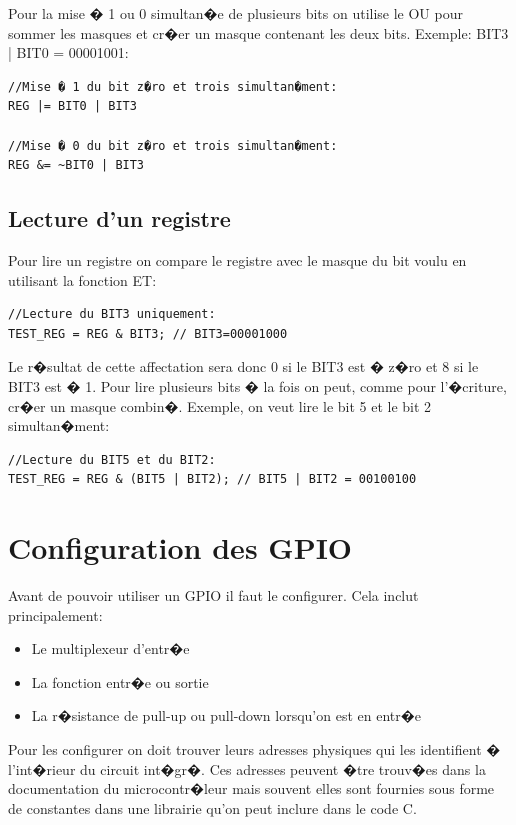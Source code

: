 Pour la mise � 1 ou 0 simultan�e de plusieurs bits on utilise le OU pour sommer les masques et cr�er un masque contenant les deux bits. Exemple: BIT3 | BIT0 = 00001001:

\lstset{style=customc}
\begin{lstlisting}
//Mise � 1 du bit z�ro et trois simultan�ment:
REG |= BIT0 | BIT3

//Mise � 0 du bit z�ro et trois simultan�ment:
REG &= ~BIT0 | BIT3
\end{lstlisting}

\subsection{Lecture d'un registre}

Pour lire un registre on compare le registre avec le masque du bit voulu en utilisant la fonction ET: 

\lstset{style=customc}
\begin{lstlisting}
//Lecture du BIT3 uniquement:
TEST_REG = REG & BIT3; // BIT3=00001000
\end{lstlisting}

Le r�sultat de cette affectation sera donc 0 si le BIT3 est � z�ro et 8 si le BIT3 est � 1. Pour lire plusieurs bits � la fois on peut, comme pour l'�criture, cr�er un masque combin�. Exemple, on veut lire le bit 5 et le bit 2 simultan�ment:

\lstset{style=customc}
\begin{lstlisting}
//Lecture du BIT5 et du BIT2:
TEST_REG = REG & (BIT5 | BIT2); // BIT5 | BIT2 = 00100100
\end{lstlisting}

\section{Configuration des GPIO}

Avant de pouvoir utiliser un GPIO il faut le configurer. Cela inclut principalement:

\begin{itemize}[label=\textbullet,font=\small]
\item Le multiplexeur d'entr�e
\item La fonction entr�e ou sortie
\item La r�sistance de pull-up ou pull-down lorsqu'on est en entr�e
\end{itemize}

Pour les configurer on doit trouver leurs adresses physiques qui les identifient � l'int�rieur du circuit int�gr�. Ces adresses peuvent �tre trouv�es dans la documentation du microcontr�leur mais souvent elles sont fournies sous forme de constantes dans une librairie qu'on peut inclure dans le code C.

